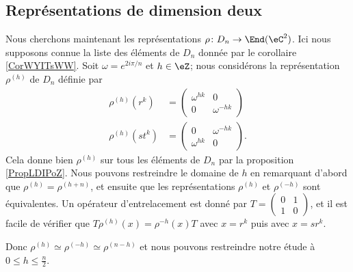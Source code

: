 \subsection{Représentations de dimension deux}

Nous cherchons maintenant les représentations \( \rho\colon D_n\to \End(\eC^2)\). Ici nous supposons connue la liste des éléments de \( D_n\) donnée par le corollaire \ref{CorWYITsWW}. Soit \( \omega= e^{2i\pi/n}\) et \( h\in \eZ\); nous considérons la représentation \( \rho^{(h)}\) de \( D_n\) définie par
\begin{subequations}
    \begin{align}
        \rho^{(h)}(r^k)&=\begin{pmatrix}
            \omega^{hk}    &   0    \\ 
            0    &   \omega^{-hk}    
        \end{pmatrix}\\
        \rho^{(h)}(st^k)&=\begin{pmatrix}
            0    &   \omega^{-hk}    \\ 
            \omega^{hk}    &   0    
        \end{pmatrix}.
    \end{align}
\end{subequations}
Cela donne bien \( \rho^{(h)}\) sur tous les éléments de \( D_n\) par la proposition \ref{PropLDIPoZ}. Nous pouvons restreindre le domaine de \( h\) en remarquant d'abord que \( \rho^{(h)}=\rho^{(h+n)}\), et ensuite que les représentations \( \rho^{(h)}\) et \( \rho^{(-h)}\) sont équivalentes. Un opérateur d'entrelacement est donné par \( T=\begin{pmatrix}
    0    &   1    \\ 
    1    &   0    
\end{pmatrix}\), et il est facile de vérifier que \( T\rho^{(h)}(x)=\rho^{-h}(x)T\) avec \( x=r^k\) puis avec \( x=sr^k\). 

Donc \( \rho^{(h)}\simeq\rho^{(-h)}\simeq\rho^{(n-h)}\) et nous pouvons restreindre notre étude à \( 0\leq h\leq \frac{ n }{2}\).

